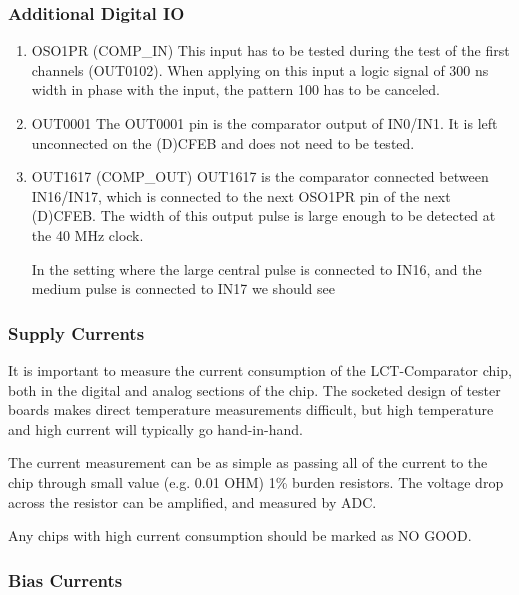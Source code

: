 \documentclass[letterpaper]{article}
\begin{document}
\subsubsection{Additional Digital IO}

\begin{enumerate}

    \item OSO1PR (COMP\_IN)
    This input has to be tested during the test of the first channels (OUT0102). When applying on this input a logic signal of 300 ns width in phase with the input, the pattern 100 has to be canceled.

    \item OUT0001
    The OUT0001 pin is the comparator output of IN0/IN1. It is left unconnected on the (D)CFEB and does not need to be tested.

    \item OUT1617 (COMP\_OUT)
    OUT1617 is the comparator connected between IN16/IN17, which is connected to the next OSO1PR pin of the next (D)CFEB. The width of this output pulse is large enough to be detected at the 40 MHz clock.

    In the setting where the large central pulse is connected to IN16, and the medium pulse is connected to IN17 we should see

\end{enumerate}

\subsubsection {Supply Currents}

It is important to measure the current consumption of the LCT-Comparator chip, both in the digital and analog sections of the chip. The socketed design of tester boards makes direct temperature measurements difficult, but high temperature and high current will typically go hand-in-hand.

The current measurement can be as simple as passing all of the current to the chip through small value (e.g. 0.01 OHM) 1\% burden resistors. The voltage drop across the resistor can be amplified, and measured by ADC.

Any chips with high current consumption should be marked as NO GOOD.

\subsubsection{Bias Currents}
\end{document}
